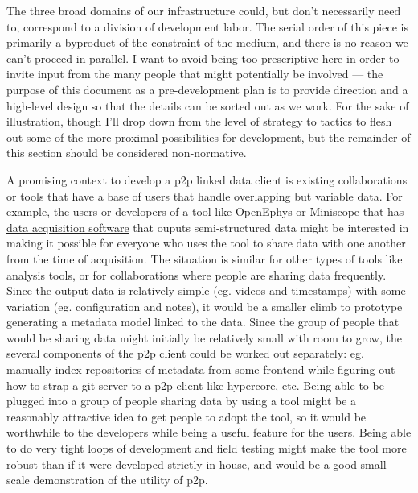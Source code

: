 The three broad domains of our infrastructure could, but don't
necessarily need to, correspond to a division of development labor. The
serial order of this piece is primarily a byproduct of the constraint of
the medium, and there is no reason we can't proceed in parallel. I want
to avoid being too prescriptive here in order to invite input from the
many people that might potentially be involved --- the purpose of this
document as a pre-development plan is to provide direction and a
high-level design so that the details can be sorted out as we work. For
the sake of illustration, though I'll drop down from the level of
strategy to tactics to flesh out some of the more proximal possibilities
for development, but the remainder of this section should be considered
non-normative.

A promising context to develop a p2p linked data client is existing
collaborations or tools that have a base of users that handle
overlapping but variable data. For example, the users or developers of a
tool like OpenEphys \citep{siegleOpenEphysOpensource2017}  or
Miniscope \citep{aharoniAllLightThat2019}  that has
\href{http://miniscope.org/index.php/Data_Acquisition_Software}{data
acquisition software} that ouputs semi-structured data might be
interested in making it possible for everyone who uses the tool to share
data with one another from the time of acquisition. The situation is
similar for other types of tools like analysis tools, or for
collaborations where people are sharing data frequently. Since the
output data is relatively simple (eg. videos and timestamps) with some
variation (eg. configuration and notes), it would be a smaller climb to
prototype generating a metadata model linked to the data. Since the
group of people that would be sharing data might initially be relatively
small with room to grow, the several components of the p2p client could
be worked out separately: eg. manually index repositories of metadata
from some frontend while figuring out how to strap a git server to a p2p
client like hypercore, etc. Being able to be plugged into a group of
people sharing data by using a tool might be a reasonably attractive
idea to get people to adopt the tool, so it would be worthwhile to the
developers while being a useful feature for the users. Being able to do
very tight loops of development and field testing might make the tool
more robust than if it were developed strictly in-house, and would be a
good small-scale demonstration of the utility of p2p.

